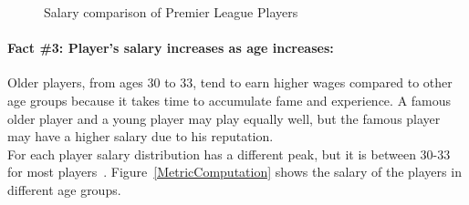 \begin{figure}
	\centering     %
	\caption{Salary comparison of Premier League Players}\label{fig:PlayersNormalizedSalary}
\end{figure}


\paragraph{Fact \#3: Player's salary increases as age increases:}
Older players, from ages 30 to 33, tend to earn higher wages compared to other age groups because it takes time to accumulate fame and experience. A famous older player and a young player may play equally well, but the famous player may have a higher salary due to his reputation. \\
For each player salary distribution has a different peak, but it is between 30-33 for most players~\cite{schwartz}. Figure~\ref{MetricComputation} shows the salary of the players in different age groups.

